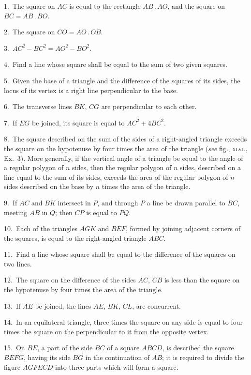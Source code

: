 \documentclass[oneside]{book}
\begin{document}
\begin{footnotesize}
1.~The square on $AC$ is equal to the rectangle $AB\,.\,AO$, and
the square on $BC = AB\,.\,BO$.

2.~The square on $CO = AO\,.\,OB$.

3.~$AC^2 - BC^2 = AO^2 - BO^2$.

4.~Find a line whose square shall be equal to the sum of two
given squares.

5.~Given the base of a triangle and the difference of the
squares of its sides, the locus of its vertex is a right line perpendicular
to the base.

6.~The transverse lines $BK$, $CG$ are perpendicular to each
other.

7.~If $EG$ be joined, its square is equal to $AC^2 + 4BC^2$.

8.~The square described on the sum of the sides of a right-angled
triangle exceeds the square on the hypotenuse by four
times the area of the triangle (\emph{see} fig., \textsc{xlvi}., Ex.~3).  More
generally, if the vertical angle of a triangle be equal to the angle
of a regular polygon of $n$ sides, then the regular polygon of
$n$ sides, described on a line equal to the sum of its sides, exceeds
the area of the regular polygon of $n$ sides described on the base
by $n$ times the area of the triangle.

9.~If $AC$ and $BK$ intersect in $P$, and through $P$ a line be drawn
parallel to $BC$, meeting $AB$ in $Q$; then $CP$ is equal to $PQ$.

10.~Each of the triangles $AGK$ and $BEF$, formed by joining
adjacent corners of the squares, is equal to the right-angled triangle
$ABC$.

11.~Find a line whose square shall be equal to the difference
of the squares on two lines.

12.~The square on the difference of the sides $AC$, $CB$ is less
than the square on the hypotenuse by four times the area of the
triangle.

13.~If $AE$ be joined, the lines $AE$, $BK$, $CL$, are concurrent.

14.~In an equilateral triangle, three times the square on any
side is equal to four times the square on the perpendicular to it
from the opposite vertex.

15.~On $BE$, a part of the side $BC$ of a square $ABCD$, is
described the square $BEFG$, having its side $BG$ in the continuation
of $AB$; it is required to divide the figure $AGFECD$ into
three parts which will form a square.


\end{footnotesize}
\end{document}
